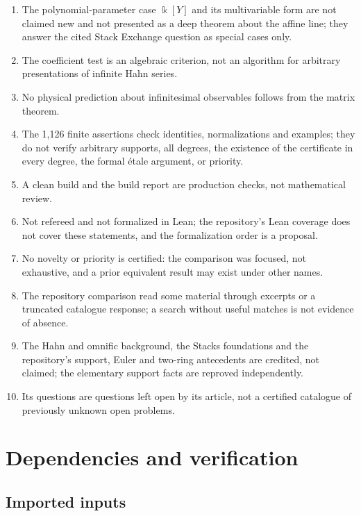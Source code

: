 \documentclass[11pt,oneside]{article}
\numberwithin{equation}{section}
\theoremstyle{definition}
\theoremstyle{remark}
\begin{document}
\begin{enumerate}[leftmargin=*,itemsep=1pt]
eigenspaces.
\item The polynomial-parameter case $\Bbbk[Y]$ and its multivariable form are not claimed new
and not presented as a deep theorem about the affine line; they answer the cited Stack
Exchange question as special cases only.
\item The coefficient test is an algebraic criterion, not an algorithm for arbitrary
presentations of infinite Hahn series.
\item No physical prediction about infinitesimal observables follows from the matrix
theorem.
\item The 1,126 finite assertions check identities, normalizations and examples; they do not
verify arbitrary supports, all degrees, the existence of the certificate in every degree,
the formal \'etale argument, or priority.
\item A clean build and the build report are production checks, not mathematical review.
\item Not refereed and not formalized in Lean; the repository's Lean coverage does not cover
these statements, and the formalization order is a proposal.
\item No novelty or priority is certified: the comparison was focused, not exhaustive, and a
prior equivalent result may exist under other names.
\item The repository comparison read some material through excerpts or a truncated catalogue
response; a search without useful matches is not evidence of absence.
\item The Hahn and omnific background, the Stacks foundations and the repository's
support, Euler and two-ring antecedents are credited, not claimed; the elementary support
facts are reproved independently.
\item Its questions are questions left open by its article, not a certified catalogue of
previously unknown open problems.
\end{enumerate}

\section{Dependencies and verification}\label{odg:app:verification}\label{odg:app:dependencies}

\subsection{Imported inputs}
\end{document}
